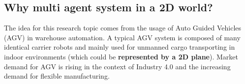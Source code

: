\documentclass[12pt, oneside]{article}
\begin{document}
\subsection{Why multi agent system in a 2D world?}
% 

% 





The idea for this research topic comes from the usage of Auto Guided Vehicles (AGV) \cite{AGV_explained} in warehouse automation. A typical AGV system is composed of many identical carrier robots and mainly used for unmanned cargo transporting in indoor environments (which could be \textbf{represented by a 2D plane}). Market demand for AGV is rising in the context of Industry 4.0 and the increasing demand for flexible manufacturing\cite{Industry_4.0}.
\end{document}
